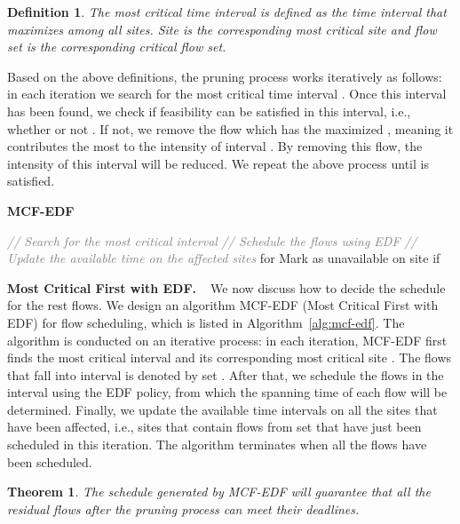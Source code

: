 \documentclass{article}
\newtheorem{theorem}{Theorem}
\newtheorem{definition}{Definition}
\newcommand{\bpara}[2]{\noindent\textbf{#1~~}{#2}}
\begin{document}
\begin{definition}
The most critical time interval  is defined as the time interval that maximizes  among all sites. Site  is the corresponding most critical site and flow set  is the corresponding critical flow set.
\end{definition}

Based on the above definitions, the pruning process works iteratively as follows: in each iteration we search for the most critical time interval . Once this interval has been found, we check if feasibility can be satisfied in this interval, i.e., whether or not . If not, we remove the flow  which has the maximized , meaning it contributes the most to the intensity of interval . By removing this flow, the intensity of this interval will be reduced. We repeat the above process until  is satisfied.


\begin{algorithm}[!t]
\caption{\label{alg:mcf-edf} \textbf{MCF-EDF}}


\begin{algorithmic}[1]
\WHILE{}
	\STATE \emph{\textcolor{gray}{// Search for the most critical interval}}
	\STATE 
	\STATE 
	\STATE \emph{\textcolor{gray}{// Schedule the flows using EDF}}
	\FOR{}
		\STATE 
		\STATE 
	\ENDFOR
	\STATE \emph{\textcolor{gray}{// Update the available time on the affected sites}}
	\FOR{}
		\STATE  for 
		\STATE Mark  as unavailable on site  if 
	\ENDFOR
\ENDWHILE
\end{algorithmic}
\end{algorithm}

\bpara{Most Critical First with EDF.}We now discuss how to decide the schedule for the rest flows. We design an algorithm MCF-EDF (Most Critical First with EDF) for flow scheduling, which is listed in Algorithm~\ref{alg:mcf-edf}. The algorithm is conducted on an iterative process: in each iteration, MCF-EDF first finds the most critical interval  and its corresponding most critical site . The flows that fall into interval  is denoted by set . After that, we schedule the flows in the interval  using the EDF policy, from which the spanning time  of each flow  will be determined. Finally, we update the available time intervals on all the sites that have been affected, i.e., sites that contain flows from set  that have just been scheduled in this iteration. The algorithm terminates when all the flows have been scheduled.

\begin{theorem}
The schedule generated by MCF-EDF will guarantee that all the residual flows after the pruning process can meet their deadlines.
\end{theorem}
\end{document}
